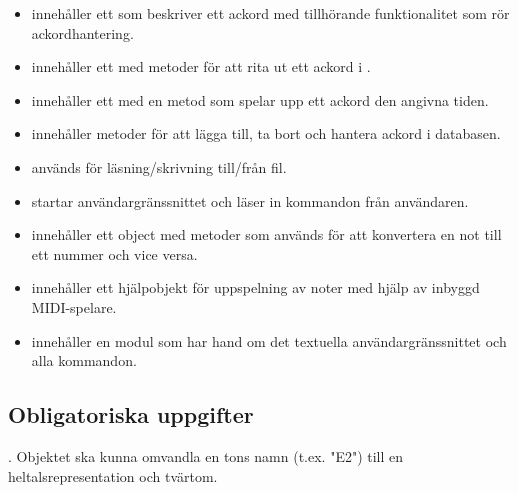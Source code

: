 \begin{itemize}
\item {} innehåller ett  som beskriver ett ackord med tillhörande  funktionalitet som rör ackordhantering.
\item {} innehåller ett  med metoder för att rita ut ett ackord i .
\item {} innehåller ett  med en metod  som spelar upp ett ackord den angivna tiden.
\item {} innehåller metoder för att lägga till, ta bort och hantera ackord i databasen.
\item {} används för läsning/skrivning till/från fil.
\item {} startar användargränssnittet och läser in kommandon från användaren.
\item {} innehåller ett object med metoder som används för att konvertera en not till ett nummer och vice versa.
\item {} innehåller ett hjälpobjekt för uppspelning av noter med hjälp av inbyggd MIDI-spelare.
\item {} innehåller en modul som har hand om det textuella användargränssnittet och alla kommandon.
\end{itemize}

\subsection{Obligatoriska uppgifter}

\Task {}. Objektet ska kunna omvandla en tons namn (t.ex. "E2") till
en heltalsrepresentation och tvärtom.

